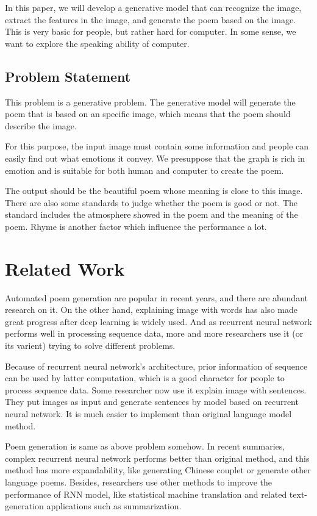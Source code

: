 \documentclass[10pt,twocolumn,letterpaper]{article}
\begin{document}
In this paper, we will develop a generative model that can recognize the image, extract the features in the image, and generate the poem based on the image. This is very basic for people, but rather hard for computer. In some sense, we want to explore the speaking ability of computer.
\subsection{Problem Statement}
This problem is a generative problem. The generative model will generate the poem that is based on an specific image, which means that the poem should describe the image. 

For this purpose, the input image must contain some information and people can easily find out what emotions it convey. We presuppose that the graph is rich in emotion and is suitable for both human and computer to create the poem.

The output should be the beautiful poem whose meaning is close to this image. There are also some standards to judge whether the poem is good or not. The standard includes the atmosphere showed in the poem and the meaning of the poem. Rhyme is another factor which influence the performance a lot.


\section{Related Work}
    Automated poem generation are popular in recent years, and there are abundant research on it. On the other hand, explaining image with words has also made great progress after deep learning is widely used. And as recurrent neural network performs well in processing sequence data, more and more researchers use it (or its varient) trying to solve different problems.

    Because of recurrent neural network’s architecture, prior information of sequence can be used by latter computation, which is a good character for people to process sequence data. Some researcher now use it explain image with sentences. They put images as input and generate sentences by model based on recurrent neural network. It is much easier to implement than original language model method.

    Poem generation is same as above problem somehow. In recent summaries, complex recurrent neural network performs better than original method, and this method has more expandability, like generating Chinese couplet or generate other language poems. Besides, researchers use other methods to improve the performance of RNN model, like statistical machine translation and related text-generation applications such as summarization.
    
\end{document}
